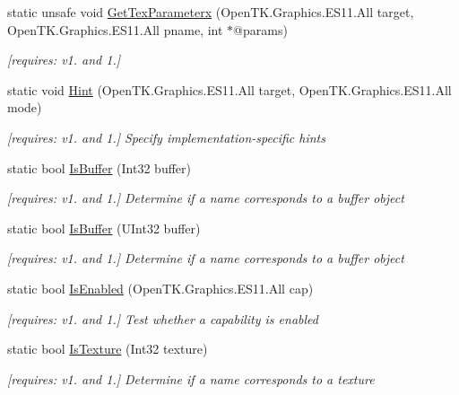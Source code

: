 \begin{DoxyCompactItemize}
static unsafe void \hyperlink{class_open_t_k_1_1_graphics_1_1_e_s11_1_1_g_l_a9f70a7f7e9e995f8c412686eb1113ebc}{Get\-Tex\-Parameterx} (Open\-T\-K.\-Graphics.\-E\-S11.\-All target, Open\-T\-K.\-Graphics.\-E\-S11.\-All pname, int $\ast$@params)
\begin{DoxyCompactList}\small\item\em \mbox{[}requires\-: v1. and 1.\mbox{]}\end{DoxyCompactList}\item 
static void \hyperlink{class_open_t_k_1_1_graphics_1_1_e_s11_1_1_g_l_a08c9690a1e04efb308842862bf160574}{Hint} (Open\-T\-K.\-Graphics.\-E\-S11.\-All target, Open\-T\-K.\-Graphics.\-E\-S11.\-All mode)
\begin{DoxyCompactList}\small\item\em \mbox{[}requires\-: v1. and 1.\mbox{]} Specify implementation-\/specific hints \end{DoxyCompactList}\item 
static bool \hyperlink{class_open_t_k_1_1_graphics_1_1_e_s11_1_1_g_l_a98b2d4646bd22d013b84216dd2eb28a7}{Is\-Buffer} (Int32 buffer)
\begin{DoxyCompactList}\small\item\em \mbox{[}requires\-: v1. and 1.\mbox{]} Determine if a name corresponds to a buffer object \end{DoxyCompactList}\item 
static bool \hyperlink{class_open_t_k_1_1_graphics_1_1_e_s11_1_1_g_l_aaac72fe92620df84977073840f8753eb}{Is\-Buffer} (U\-Int32 buffer)
\begin{DoxyCompactList}\small\item\em \mbox{[}requires\-: v1. and 1.\mbox{]} Determine if a name corresponds to a buffer object \end{DoxyCompactList}\item 
static bool \hyperlink{class_open_t_k_1_1_graphics_1_1_e_s11_1_1_g_l_ab8166ef3bbd77057adcd76b09618f680}{Is\-Enabled} (Open\-T\-K.\-Graphics.\-E\-S11.\-All cap)
\begin{DoxyCompactList}\small\item\em \mbox{[}requires\-: v1. and 1.\mbox{]} Test whether a capability is enabled \end{DoxyCompactList}\item 
static bool \hyperlink{class_open_t_k_1_1_graphics_1_1_e_s11_1_1_g_l_a06cbba4391b2a8672b9bee8478c32a5e}{Is\-Texture} (Int32 texture)
\begin{DoxyCompactList}\small\item\em \mbox{[}requires\-: v1. and 1.\mbox{]} Determine if a name corresponds to a texture \end{DoxyCompactList}\item 

\end{DoxyCompactItemize}
